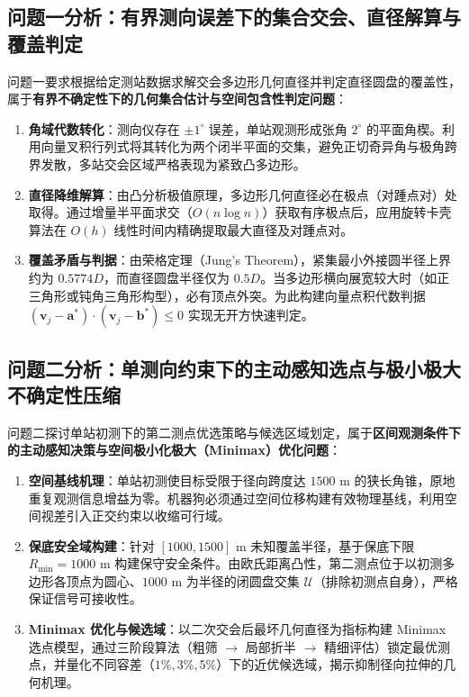 \documentclass[zihao=-4,a4paper,UTF8]{ctexart}
\begin{document}
\subsection{问题一分析：有界测向误差下的集合交会、直径解算与覆盖判定}
问题一要求根据给定测站数据求解交会多边形几何直径并判定直径圆盘的覆盖性，属于\textbf{有界不确定性下的几何集合估计与空间包含性判定问题}：
\begin{enumerate}[leftmargin=2.0em, itemsep=0.1em, topsep=0.1em]
    \item \textbf{角域代数转化}：测向仪存在 $\pm 1^\circ$ 误差，单站观测形成张角 $2^\circ$ 的平面角楔。利用向量叉积行列式将其转化为两个闭半平面的交集，避免正切奇异角与极角跨界发散，多站交会区域严格表现为紧致凸多边形。
    \item \textbf{直径降维解算}：由凸分析极值原理，多边形几何直径必在极点（对踵点对）处取得。通过增量半平面求交（$O(n\log n)$）获取有序极点后，应用旋转卡壳算法在 $O(h)$ 线性时间内精确提取最大直径及对踵点对。
    \item \textbf{覆盖矛盾与判据}：由荣格定理（Jung's Theorem），紧集最小外接圆半径上界约为 $0.5774D$，而直径圆盘半径仅为 $0.5D$。当多边形横向展宽较大时（如正三角形或钝角三角形构型），必有顶点外突。为此构建向量点积代数判据 $(\mathbf{v}_j - \mathbf{a}^*) \cdot (\mathbf{v}_j - \mathbf{b}^*) \le 0$ 实现无开方快速判定。
\end{enumerate}

\subsection{问题二分析：单测向约束下的主动感知选点与极小极大不确定性压缩}
问题二探讨单站初测下的第二测点优选策略与候选区域划定，属于\textbf{区间观测条件下的主动感知决策与空间极小化极大（Minimax）优化问题}：
\begin{enumerate}[leftmargin=2.0em, itemsep=0.1em, topsep=0.1em]
    \item \textbf{空间基线机理}：单站初测使目标受限于径向跨度达 $1500\text{ m}$ 的狭长角锥，原地重复观测信息增益为零。机器狗必须通过空间位移构建有效物理基线，利用空间视差引入正交约束以收缩可行域。
    \item \textbf{保底安全域构建}：针对 $[1000, 1500]\text{ m}$ 未知覆盖半径，基于保底下限 $R_{\min}=1000\text{ m}$ 构建保守安全条件。由欧氏距离凸性，第二测点位于以初测多边形各顶点为圆心、$1000\text{ m}$ 为半径的闭圆盘交集 $\mathcal{U}$（排除初测点自身），严格保证信号可接收性。
    \item \textbf{Minimax 优化与候选域}：以二次交会后最坏几何直径为指标构建 Minimax 选点模型，通过三阶段算法（粗筛 $\to$ 局部折半 $\to$ 精细评估）锁定最优测点，并量化不同容差（$1\%, 3\%, 5\%$）下的近优候选域，揭示抑制径向拉伸的几何机理。
\end{enumerate}
\end{document}
